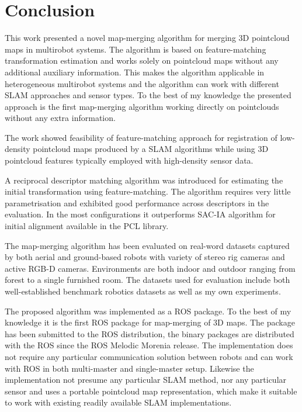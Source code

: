 \chapter*{Conclusion}

This work presented a novel map-merging algorithm for merging \gls{3D} pointcloud maps in multirobot systems. The algorithm is based on feature-matching transformation estimation and works solely on pointcloud maps without any additional auxiliary information. This makes the algorithm applicable in heterogeneous multirobot systems and the algorithm can work with different \gls{SLAM} approaches and sensor types. To the best of my knowledge the presented approach is the first map-merging algorithm working directly on pointclouds without any extra information.

The work showed feasibility of feature-matching approach for registration of low-density pointcloud maps produced by a \gls{SLAM} algorithms while using \gls{3D} pointcloud features typically employed with high-density sensor data.

A reciprocal descriptor matching algorithm was introduced for estimating the initial transformation using feature-matching. The algorithm requires very little parametrisation and exhibited good performance across descriptors in the evaluation. In the most configurations it outperforms \gls{SAC-IA} algorithm for initial alignment available in the \gls{PCL} library.

The map-merging algorithm has been evaluated on real-word datasets captured by both aerial and ground-based robots with variety of stereo rig cameras and active \gls{RGB-D} cameras. Environments are both indoor and outdoor ranging from forest to a single furnished room. The datasets used for evaluation include both well-established benchmark robotics datasets as well as my own experiments.

The proposed algorithm was implemented as a \gls{ROS} package. To the best of my knowledge it is the first \gls{ROS} package for map-merging of \gls{3D} maps. The package has been submitted to the \gls{ROS} distribution, the binary packages are distributed with the \gls{ROS} since the \gls{ROS} Melodic Morenia release. The implementation does not require any particular communication solution between robots and can work with \gls{ROS} in both multi-master and single-master setup. Likewise the implementation not presume any particular \gls{SLAM} method, nor any particular sensor and uses a portable pointcloud map representation, which make it suitable to work with existing readily available \gls{SLAM} implementations.


